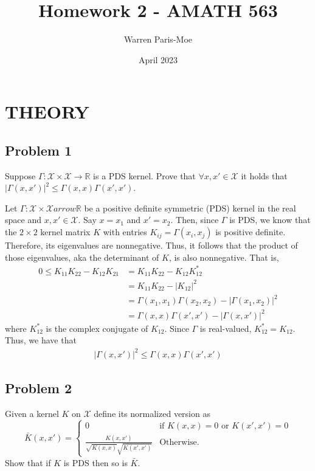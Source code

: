 \documentclass[12pt]{article}
\title{Homework 2 - AMATH 563}
\author{Warren Paris-Moe}
\date{April 2023}
\begin{document}
\maketitle

\section*{THEORY}

\subsection*{Problem 1}
\begin{mdframed}
    Suppose $\Gamma: \mathcal{X} \times \mathcal{X} \to \mathbb{R}$ is a PDS kernel. 
    Prove that $\forall x, x' \in \mathcal{X}$ it holds that
    $|\Gamma(x, x')|^2 \leq \Gamma(x, x) \Gamma(x', x')$.
\end{mdframed}

Let $\Gamma:\mathcal{X}\times\mathcal{X}arrow\mathbb{R}$ be a positive definite symmetric (PDS)
kernel in the real space and $x,x' \in \mathcal{X}$. Say $x=x_1$ and $x'=x_2$. Then, since $\Gamma$ 
is PDS, we know that the $2 \times 2$ kernel matrix $K$ with entries $K_{ij} = \Gamma(x_i, x_j)$ is 
positive definite. Therefore, its eigenvalues are nonnegative. Thus, it follows that the product of 
those eigenvalues, aka the determinant of $K$, is also nonnegative. That is,
\begin{align*}
    0 \leq K_{11}K_{22} - K_{12}K_{21} &= K_{11}K_{22} - K_{12}K_{12}^* \\
    &= K_{11}K_{22} - |K_{12}|^2 \\
    &= \Gamma(x_1, x_1)\Gamma(x_2, x_2) - |\Gamma(x_1, x_2)|^2 \\
    &= \Gamma(x, x)\Gamma(x', x') - |\Gamma(x, x')|^2
\end{align*}
where $K_{12}^*$ is the complex conjugate of $K_{12}$. Since $\Gamma$ is real-valued,
$K_{12}^* = K_{12}$. Thus, we have that 
\begin{align}
    |\Gamma(x, x')|^2 \leq \Gamma(x, x)\Gamma(x', x')
\end{align}


\subsection*{Problem 2} %
\begin{mdframed}
    Given a kernel $K$ on $\mathcal{X}$ define its normalized version as
    \[
    \bar{K}(x,x') = 
        \begin{cases}
            0 & \text{if } K(x,x)=0 \text{ or } K(x', x')=0 \\ 
            \frac{K(x, x')}{\sqrt{K(x, x)} \sqrt{K(x', x')}} & \text{Otherwise.} 
        \end{cases}
    \]
    Show that if $K$ is PDS then so is $\bar{K}$.
\end{mdframed}
\end{document}
